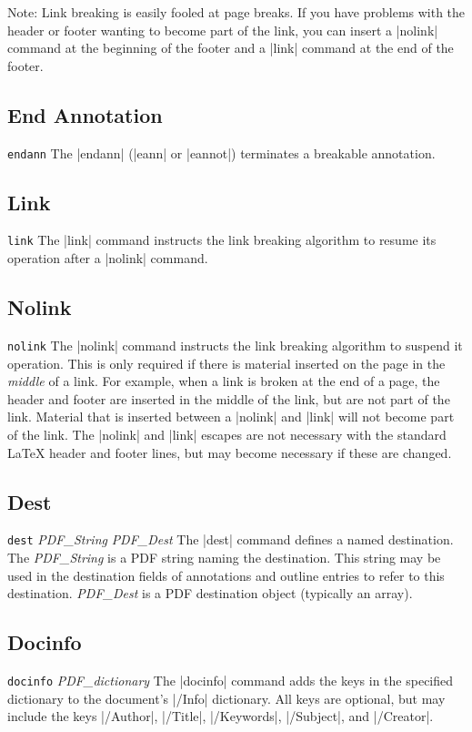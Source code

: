 {Note:  Link breaking is easily fooled at page breaks.  If you have problems
with the header or footer wanting to become part of the link, you can
insert a |nolink| command at the beginning of the footer and a |link|
command at the end of the footer.

\subsection{End Annotation}
\syntax
{\tt endann}
\description
The |endann| (|eann| or |eannot|) terminates a breakable annotation.

\subsection{Link}
{\tt link}
\description
The |link| command instructs the link breaking algorithm to resume its
operation after a |nolink| command.

\subsection{Nolink}
{\tt nolink}
\description
The |nolink| command instructs the link breaking algorithm to suspend
it operation.  This is only required if there is material inserted
on the page in the {\it middle} of a link.  For example, when a link
is broken at the end of a page, the header and footer are inserted
in the middle of the link, but are not part of the link.  Material
that is inserted between a |nolink| and |link| will not become
part of the link.  The |nolink| and |link| escapes are not necessary
with the standard LaTeX header and footer lines, but may become necessary
if these are changed.

\subsection{Dest}
\syntax
{\tt dest} {\it PDF\_String} {\it PDF\_Dest}
\description
The |dest| command defines a named destination.
The {\it PDF\_String} is a PDF string naming
the destination.  This string may be used in the destination
fields of annotations and outline entries to refer to
this destination.  {\it PDF\_Dest} is a PDF
destination object (typically an array).
\example
\begintt
{}
\endtt

\subsection{Docinfo}
\syntax
{\tt docinfo} {\it PDF\_dictionary}
\description
The |docinfo| command adds the keys in the specified dictionary to the
document's |/Info| dictionary.  All keys are optional, but may include
the keys |/Author|, |/Title|, |/Keywords|, |/Subject|,
and |/Creator|.
\example
\begintt
{}
\endtt

}
